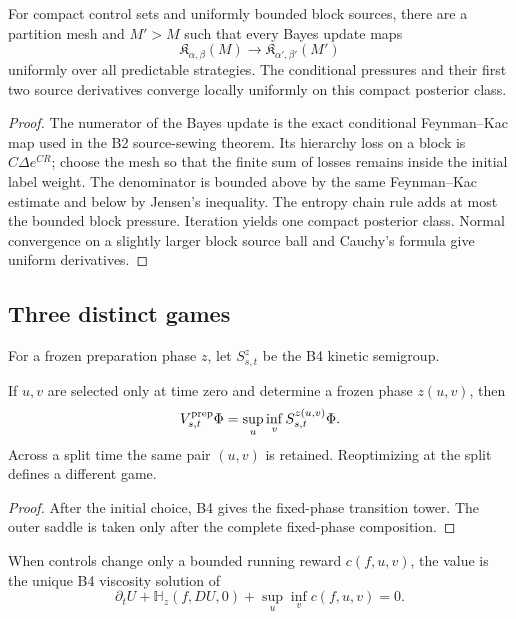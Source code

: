 \begin{lemma}
\label{lem:r5-c1-stability}
For compact control sets and uniformly bounded block sources, there are a
partition mesh and \(M'>M\) such that every Bayes update maps
\[
 \mathfrak K_{\alpha,\beta}(M)
 \longrightarrow\mathfrak K_{\alpha',\beta'}(M')
\]
uniformly over all predictable strategies.  The conditional pressures and
their first two source derivatives converge locally uniformly on this compact
posterior class.
\end{lemma}

\begin{proof}
The numerator of the Bayes update is the exact conditional Feynman--Kac map
used in the B2 source-sewing theorem.  Its hierarchy loss on a block is
\(C\Delta e^{CR}\); choose the mesh so that the finite sum of losses remains
inside the initial label weight.  The denominator is bounded above by the same
Feynman--Kac estimate and below by Jensen's inequality.  The entropy chain
rule adds at most the bounded block pressure.  Iteration yields one compact
posterior class.  Normal convergence on a slightly larger block source ball
and Cauchy's formula give uniform derivatives.
\end{proof}

\subsection{Three distinct games}

For a frozen preparation phase \(z\), let \(S_{s,t}^z\) be the B4 kinetic
semigroup.

\begin{theorem}
\label{thm:r5-c1-prep}
If \(u,v\) are selected only at time zero and determine a frozen phase
\(z(u,v)\), then
\[
 V_{s,t}^{\rm prep}\Phi=
 \sup_u\inf_v S_{s,t}^{z(u,v)}\Phi.
\]
Across a split time the same pair \((u,v)\) is retained.  Reoptimizing at the
split defines a different game.
\end{theorem}

\begin{proof}
After the initial choice, B4 gives the fixed-phase transition tower.  The
outer saddle is taken only after the complete fixed-phase composition.
\end{proof}

\begin{theorem}
\label{thm:r5-c1-reward}
When controls change only a bounded running reward \(c(f,u,v)\), the value is
the unique B4 viscosity solution of
\[
 \partial_tU+\mathbb H_z(f,DU,0)+\sup_u\inf_v c(f,u,v)=0.
\]
\end{theorem}

